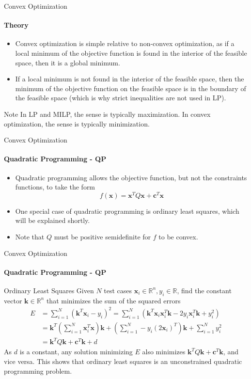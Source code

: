 \documentclass{beamer}
\renewcommand{\vec}{\mathbf}
\begin{document}
	\begin{frame}{Convex Optimization}
		\framesubtitle{Theory}
		\begin{itemize}
			\item Convex optimization is simple relative to non-convex optimization, as if a local minimum of the objective function is found in the interior of the feasible space, then it is a global minimum.
			\item If a local minimum is not found in the interior of the feasible space, then the minimum of the objective function on the feasible space is in the boundary of the feasible space (which is why strict inequalities are not used in LP).
		\end{itemize}
		\begin{block}{Note}
			In LP and MILP, the sense is typically maximization. In convex optimization, the sense is typically minimization.
		\end{block}
	\end{frame}
	
	\begin{frame}{Convex Optimization}
		\framesubtitle{Quadratic Programming - QP}
		\begin{itemize}
			\item Quadratic programming allows the objective function, but not the constraints functions, to take the form
			\[f(\vec{x}) = \vec{x}^TQ\vec{x} + \vec{c}^T\vec{x}\]
			\item One special case of quadratic programming is ordinary least squares, which will be explained shortly.
			\item Note that $Q$ must be positive semidefinite for $f$ to be convex.
		\end{itemize}
	\end{frame}

	\begin{frame}{Convex Optimization}
		\framesubtitle{Quadratic Programming - QP}
		\begin{block}{Ordinary Least Squares}
			Given $N$ test cases $\vec{x}_i\in\mathbb{R}^n, y_i\in\mathbb{R}$, find the constant vector $\vec{k}\in\mathbb{R}^n$ that minimizes the sum of the squared errors 
			\begin{align*}
			E &= \sum_{i=1}^{N}(\vec{k}^T\vec{x}_i - y_i)^2= \sum_{i=1}^{N}(\vec{k}^T\vec{x}_i\vec{x}_i^T\vec{k} - 2y_i\vec{x}_i^T\vec{k}+y_i^2)\\
			&= \vec{k}^T(\sum_{i=1}^{N}\vec{x}_i^T\vec{x})\vec{k} + (\sum_{i=1}^{N}-y_i(2\vec{x}_i)^T)\vec{k} + \sum_{i=1}^{N}y_i^2\\
			&= \vec{k}^TQ\vec{k} + \vec{c}^T\vec{k} + d
			\end{align*}
			As $d$ is a constant, any solution minimizing $E$ also minimizes $\vec{k}^TQ\vec{k}+\vec{c}^T\vec{k}$, and vice versa. This shows that ordinary least squares is an unconstrained quadratic programming problem.
		\end{block}
	\end{frame}
	
\end{document}
